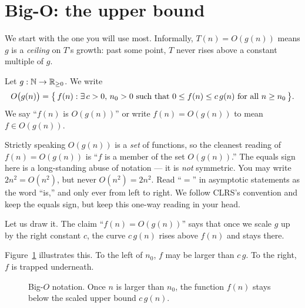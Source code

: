 \section{Big-O: the upper bound}

We start with the one you will use most. Informally, $T(n) = O(g(n))$ means $g$ is a
\emph{ceiling} on $T$'s growth: past some point, $T$ never rises above a constant
multiple of $g$.

\begin{formalbox}
\begin{definition}[Big-O]\label{ch03:def-bigo}
Let $g:\N\to\R_{\ge 0}$. We write
\[
  O\bigl(g(n)\bigr) = \set[\big]{\, f(n) : \exists\, c>0,\, n_0>0
  \text{ such that } 0 \le f(n) \le c\,g(n) \text{ for all } n \ge n_0 \,}.
\]
We say ``$f(n)$ is $O(g(n))$'' or write $f(n)=O(g(n))$ to mean $f \in O(g(n))$.
\end{definition}
\end{formalbox}

\begin{trapbox}
Strictly speaking $O(g(n))$ is a \emph{set} of functions, so the cleanest reading
of $f(n)=O(g(n))$ is ``$f$ is a member of the set $O(g(n))$.'' The equals sign here
is a long-standing abuse of notation --- it is \emph{not} symmetric. You may write
$2n^2 = O(n^2)$, but never $O(n^2) = 2n^2$. Read ``$=$'' in asymptotic statements as
the word ``is,'' and only ever from left to right. We follow CLRS's convention and
keep the equals sign, but keep this one-way reading in your head.
\end{trapbox}

Let us draw it. The claim ``$f(n) = O(g(n))$'' says that once we scale $g$ up by the
right constant $c$, the curve $c\,g(n)$ rises above $f(n)$ and stays there.

Figure~\ref{ch03:fig-bigo} illustrates this. To the left of $n_0$, $f$ may be larger than $c\,g$. To the right, $f$ is trapped underneath.

\begin{figure}[htbp]
\centering
{}
\caption{Big-$O$ notation. Once $n$ is larger than $n_0$, the function $f(n)$ stays below the scaled upper bound $c\,g(n)$.}
\label{ch03:fig-bigo}
\end{figure}

